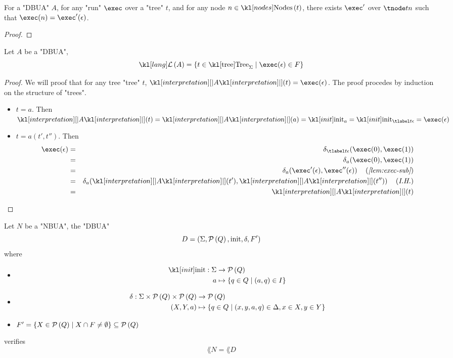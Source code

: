 \documentclass{article}
\begin{document}
\begin{lemma}\label{lem:exec-sub}
	For a "DBUA" $A$, for any "run" $\exec$ over a "tree" $t$, and for any node $n \in \nodes t$, there exists $\exec'$ over
	$\tnode t n$ such that $\exec (n) = \exec'(\epsilon)$.
\end{lemma}

\begin{proof}
	\todo{}
\end{proof}

\begin{lemma}
	Let $A$ be a "DBUA",
	\[ \lang A = \setdef {t \in \tree_{\Sigma}} {\exec (\epsilon) \in F} \]
\end{lemma}

\begin{proof}
	We will proof that for any tree "tree" $t$, $\interpret A (t) = \exec (\epsilon)$.
	The proof procedes by induction on the structure of "trees".
	\begin{itemize}
		\item $t = a$. Then
		      $\interpret A (t) = \interpret A (a)=  \init_a = \init_{\tlabel t {\epsilon}} = \exec (\epsilon)$
		\item $t = a(t',t'')$. Then
		      \begin{eqnarray*}
			      \exec (\epsilon)  &=& \delta_{\tlabel t {\epsilon}}(\exec (0), \exec (1)) \\
			      &=& \delta_a (\exec (0), \exec (1)) \\
			      &=& \delta_a (\exec' (\epsilon), \exec''  (\epsilon))  \reason{\ref{lem:exec-sub}}\\
			      &=& \delta_a (\interpret A (t'), \interpret A (t'')) \reason{I.H.}\\
			      &=& \interpret A (t)
		      \end{eqnarray*}
	\end{itemize}
\end{proof}

\begin{theorem}
	Let $N$ be a "NBUA", the "DBUA"
	\[ D = (\Sigma, \mathcal{P}\left(Q\right), \text{init} , \delta , F' ) \]
	where
	\begin{itemize}
		\item \begin{align*}
			      \init : \Sigma & \to      \parts Q                        \\
			      a              & \mapsto  \setdef {q \in Q} {(a,q) \in I}
		      \end{align*}
		\item \begin{align*}
			      \delta   : \Sigma \times \mathcal{P}\left(Q\right) \times \mathcal{P}\left(Q\right) & \to \mathcal{P}\left(Q\right)                                                        \\
			      ( X, Y, a)                                        & \mapsto \left\{q \in  Q \mid (x,y,a,q) \in \Delta, x \in X, y \in Y\right\}
		      \end{align*}
		\item $F'  = \left\{X \in \mathcal{P}\left(Q\right) \mid X \cap F \neq \emptyset\right\} \subseteq \mathcal{P}\left(Q\right)$
	\end{itemize}
	verifies
	\[ \lang N = \lang D \]
\end{theorem}
\end{document}
